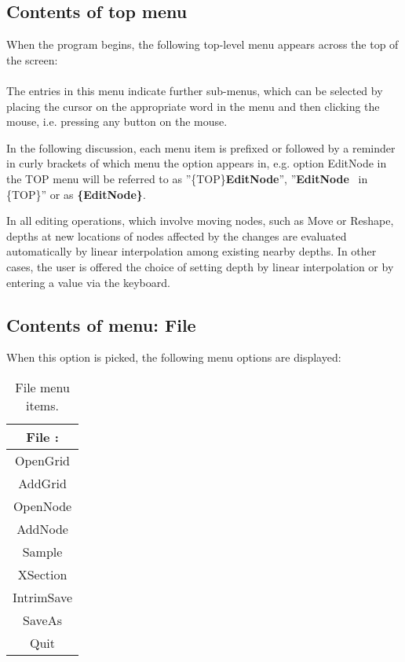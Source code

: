 \documentclass{article}
\begin{document}
\subsection{Contents of top menu}
When the program begins, the following top-level menu appears across the top of the screen:
\\

\noindent
{}
\\

The entries in this menu indicate further sub-menus, which can be selected by placing the cursor on the appropriate word in the menu and then clicking the mouse, i.e. pressing any button on the mouse.

In the following discussion, each menu item is prefixed or followed by a reminder in curly brackets of which menu the option appears in, e.g. option EditNode in the TOP menu will be referred to as ''\{TOP\}\textbf{EditNode{}}'', ''\textbf{EditNode} \ in \{TOP\}'' or as \textbf{\{EditNode\}}.

In all editing operations, which involve moving nodes, such as Move or Reshape, depths at new locations of nodes affected by the changes are evaluated automatically by linear interpolation among existing nearby depths. In other cases, the user is offered the choice of setting depth by linear interpolation or by entering a value via the keyboard.

\subsection{Contents of menu: File}
When this option is picked, the following menu options are displayed:

\begin{table}[htb!]
 \caption{File menu items.}
  \begin{center}
   \begin{tabular}{|c|}
    \hline
File :\\     \hline
OpenGrid \\ AddGrid \\     \hline
OpenNode \\ AddNode \\    \hline
Sample \\    \hline
XSection \\    \hline
IntrimSave \\ SaveAs \\    \hline
 Quit\\
    \hline
   \end{tabular}
   \label{tab:FILE}
  \end{center}
\end{table}
\end{document}
